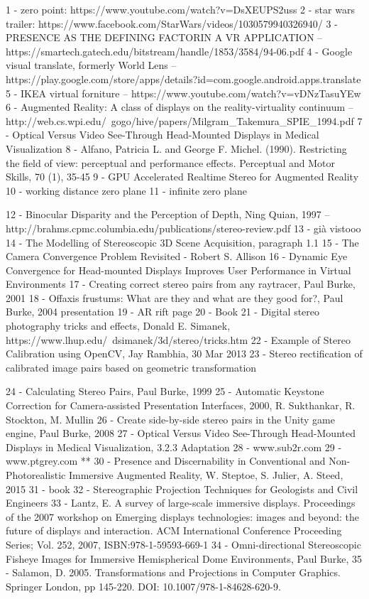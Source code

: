 1 - zero point: https://www.youtube.com/watch?v=DsXEUPS2uss
2 - star wars trailer: https://www.facebook.com/StarWars/videos/1030579940326940/
3 - PRESENCE AS THE DEFINING FACTORIN A VR APPLICATION -- https://smartech.gatech.edu/bitstream/handle/1853/3584/94-06.pdf
4 - Google visual translate, formerly World Lens -- https://play.google.com/store/apps/details?id=com.google.android.apps.translate
5 - IKEA virtual forniture -- https://www.youtube.com/watch?v=vDNzTasuYEw
6 - Augmented Reality: A class of displays on the reality-virtuality continuum -- http://web.cs.wpi.edu/~gogo/hive/papers/Milgram_Takemura_SPIE_1994.pdf
7 - Optical Versus Video See-Through Head-Mounted Displays in Medical Visualization
8 - Alfano, Patricia L. and George F. Michel. (1990). Restricting the field of view: perceptual and
performance effects. 
Perceptual and Motor Skills, 70
(1), 35-45
9 - GPU Accelerated Realtime Stereo for Augmented Reality
10 - working distance zero plane
11 - infinite zero plane

12 - Binocular Disparity and the Perception of Depth, Ning Quian, 1997 -- http://brahms.cpmc.columbia.edu/publications/stereo-review.pdf
13 - già vistooo
14 - The Modelling of Stereoscopic 3D Scene Acquisition, paragraph 1.1
15 - The Camera Convergence Problem Revisited - Robert S. Allison
16 - Dynamic Eye Convergence for Head-mounted Displays Improves User Performance in Virtual Environments
17 - Creating correct stereo pairs from any raytracer, Paul Burke, 2001
18 - Offaxis frustums: What are they and what are they good for?, Paul Burke, 2004 presentation
19 - AR rift page
20 - Book
21 - Digital stereo photography tricks and effects, Donald E. Simanek, https://www.lhup.edu/~dsimanek/3d/stereo/tricks.htm
22 - Example of Stereo Calibration using OpenCV, Jay Rambhia, 30 Mar 2013
23 - Stereo rectification of calibrated image pairs based on geometric transformation


24 - Calculating Stereo Pairs, Paul Burke, 1999
25 - Automatic Keystone Correction for Camera-assisted Presentation Interfaces, 2000, R. Sukthankar, R. Stockton, M. Mullin
26 - Create side-by-side stereo pairs in the Unity game engine, Paul Burke, 2008
27 - Optical Versus Video See-Through Head-Mounted Displays in Medical Visualization, 3.2.3 Adaptation
28 - www.sub2r.com
29 - www.ptgrey.com
** 30 - Presence and Discernability in Conventional and Non-Photorealistic Immersive Augmented Reality, W. Steptoe, S. Julier, A. Steed, 2015
31 - book
32 - Stereographic Projection Techniques for Geologists and Civil Engineers
33 - Lantz, E. A survey of large-scale immersive displays. Proceedings of the 2007 workshop on Emerging displays technologies: images and beyond: the future of displays and interaction. ACM International Conference Proceeding Series; Vol. 252, 2007, ISBN:978-1-59593-669-1
34 - Omni-directional Stereoscopic Fisheye Images for Immersive Hemispherical Dome Environments, Paul Burke, 
35 - Salamon, D. 2005. Transformations and Projections in Computer Graphics. Springer London, pp 145-220. DOI: 10.1007/978-1-84628-620-9.


